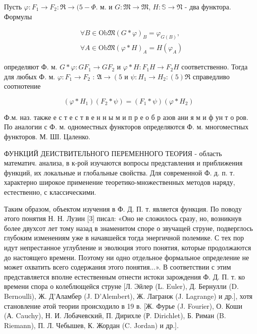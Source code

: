 \documentclass[10pt]{article}
\begin{document}
Пусть $\varphi: F_{1} \longrightarrow F_{2}: \mathfrak{R} \rightarrow(5-\Phi$. м. и $G: \mathfrak{M} \rightarrow \mathfrak{M}$, $H: \mathbb{S} \longrightarrow \mathfrak{N}$ - два функтора. Формулы



\[

\begin{aligned}

& \forall B \in \mathrm{Ob} \mathfrak{M}(G * \varphi)_{B}=\varphi_{G(B)}, \\

& \forall A \in \mathrm{Ob} \mathfrak{M}(\varphi * H)_{A}=H\left(\varphi_{A}\right)

\end{aligned}

\]



определяют Ф. м. $G * \varphi: G F_{1} \longrightarrow G F_{2}$ и $\varphi * H: F_{1} H \longrightarrow F_{2} H$ соответственно. Тогда для любых Ф. м. $\varphi: F_{1} \rightarrow F_{2}$ : $\mathfrak{A} \longrightarrow\left(5\right.$ и $\psi: H_{1} \longrightarrow H_{2}:(5) \Re$ справедливо соотнотение



\[

\left(\varphi * H_{1}\right)\left(F_{2} * \psi\right)=\left(F_{1} * \psi\right)\left(\varphi * H_{2}\right)

\]



Ф.м. наз. также е с т е с т в е н н ы м и п р е о б р азов ани я м и ф ун т о ров. По аналогии с Ф. м. одноместных функторов определяются Ф. м. многоместных функторов. $М$. ШІ. Цаленко.



ФУНКЦИЙ ДЕИСТВИТЕЛЬНОГО ПЕРЕМЕННОГО ТЕОРИЯ - область математич. анализа, в к-рой изучаются вопросы представления и приближения функций, их локальные и глобальные свойства. Для современной Ф. д. п. т. характерно широкое применение теоретико-множественных методов наряду, естественно, с классическими.



Таким образом, объектом изучения в Ф. Д. П. т. является функция. По поводу әтого понятия Н. Н. Лузин [3] писал: «Оно не сложилось сразу, но, возникнув более двухсот лет тому назад в знаменитом споре о звучащей струне, подверглось глубоким изменениям уже в начавшейся тогда энергичной полемике. С тех пор идут непрестанное углубление и эволюция этого понятия, которые продолжаются до настоящего времени. Поэтому ни одно отдельное формальное определение не может охватить всего содержания этого понятия...». В соответствии с этим представляется вполне естественным отнести истоки зарождения Ф. Д. П. т. ко времени спора о колеблющейся струне [Л. Эйлер (L. Euler), Д. Бернулли (D. Bernoulli), Ж. Д'Аламбер (J. D'Alembert), Ж. Лагранж (J. Lagrange) и др.], хотя становление әтой теории происходило в 19 в. [Ж. Фурье (J. Fourier), О. Коши (А. Cauchy), Н. И. Лобачевский, П. Дирихле (Р. Dirichlet), Б. Риман (B. Riemann), П. Л. Чебышев, К. Жордан (C. Jordan) и др.].
\end{document}
